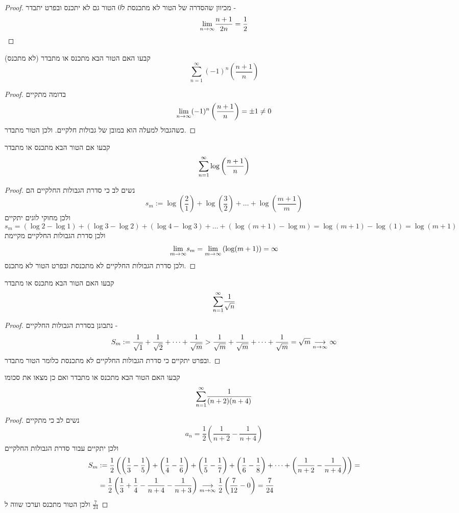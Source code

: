 \documentclass{article}
\begin{document}
\begin{proof}
מכיוון שהסדרה של הטור לא מתכנסת ל0 הטור גם לא יתכנס ובפרט יתבדר - 
\[\underset{n\rightarrow\infty}{\lim} \frac{n+1}{2n} = \frac{1}{2}\]
\end{proof}

\begin{exercise}
קבעו האם הטור הבא מתכנס או מתבדר (לא מתכנס)
\[\sum_{n=1}^\infty (-1)^n \left(\frac{n+1}{n}\right)\]
\end{exercise}

\begin{proof}
בדומה מתקיים 
\[\underset{n\rightarrow\infty}{\lim} (-1)^n \left(\frac{n+1}{n}\right) = \pm 1\neq 0\]
כשהגבול למעלה הוא במובן של גבולות חלקיים. ולכן הטור מתבדר.
\end{proof}

\begin{exercise}
קבעו אם הטור הבא מתכנס או מתבדר
\[\overset{\infty}{\underset{n=1}{\sum}} \log\left(\frac{n+1}{n}\right)\]
\end{exercise}

\begin{proof}
נשים לב כי סדרת הגבולות החלקיים הם 
\[s_m:=\log\left(\frac{2}{1}\right)+\log\left(\frac{3}{2}\right)+\dots+\log\left(\frac{m+1}{m}\right)\]
ולכן מחוקי לוגים יתקיים 
\[s_m = (\log 2-\log 1) + (\log 3-\log 2) + (\log 4-\log 3) + \dots +(\log(m+1) - \log m) = \log(m+1)-\log(1) = \log(m+1)\]
ולכן סדרת הגבולות החלקיים מקיימת
\[\underset{m\rightarrow\infty}{\lim} s_m = \underset{m\rightarrow\infty}{\lim} \left(\log (m+1)\right) = \infty\]
ולכן סדרת הגבולות החלקיים לא מתכנסת ובפרט הטור לא מתכנס.
\end{proof}

\begin{exercise}
קבעו האם הטור הבא מתכנס או מתבדר 
\[\overset{\infty}{\underset{n=1}{\sum}} \frac{1}{\sqrt{n}}\]
\end{exercise}

\begin{proof}
נתבונן בסדרת הגבולות החלקיים - 
\[S_m:= \frac{1}{\sqrt{1}}+\frac{1}{\sqrt{2}} + \dots + \frac{1}{\sqrt{m}} > \frac{1}{\sqrt{m}}+\frac{1}{\sqrt{m}}+\dots +\frac{1}{\sqrt{m}} = \sqrt{m}\underset{n\rightarrow\infty}{\longrightarrow} \infty\]
ובפרט יתקיים כי סדרת הגבולות החלקיים לא מתכנסת כלומר הטור מתבדר.
\end{proof}

\begin{exercise}
קבעו האם הטור הבא מתכנס או מתבדר ואם כן מצאו את סכומו
\[\overset{\infty}{\underset{n=1}{\sum}} \frac{1}{(n+2)(n+4)}\]
\end{exercise}

\begin{proof}
נשים לב כי מתקיים 
\[a_n = \frac{1}{2}\left(\frac{1}{n+2}-\frac{1}{n+4}\right)\]
ולכן יתקיים עבור סדרת הגבולות החלקיים 
\begin{align*}
S_m&:=\frac{1}{2}\left(\left(\frac{1}{3}-\frac{1}{5}\right)+\left(\frac{1}{4}-\frac{1}{6}\right) + \left(\frac{1}{5}-\frac{1}{7}\right) + \left(\frac{1}{6}-\frac{1}{8}\right) + \dots + \left(\frac{1}{n+2}-\frac{1}{n+4}\right)\right)= \\ &= \frac{1}{2}\left(\frac{1}{3}+\frac{1}{4} - \frac{1}{n+4}-\frac{1}{n+3}\right)\underset{m\rightarrow\infty}{\longrightarrow} \frac{1}{2}\left(\frac{7}{12} - 0\right) = \frac{7}{24}
\end{align*}
ולכן הטור מתכנס וערכו שווה ל 
$\frac{7}{24}$
\end{proof}
\end{document}
